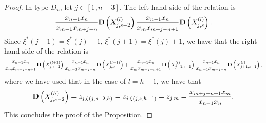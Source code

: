 \documentclass[10pt,a4paper]{amsart}
\newcommand\scalemath[2]{\scalebox{#1}{\mbox{\ensuremath{\displaystyle #2}}}}
\begin{document}
\begin{proof}
In type $D_n$, let $j \in [1,n-3]$. The left hand side of the relation is
\begin{align*}
\frac{x_{n-1}x_n}{x_{m-1}x_{m+j-n}} {\bf D}\left( X_{j,s-2}^{(l)} \right) \frac{x_{n-1}x_n}{x_{m}x_{m+j-n+1}} {\bf D}\left( X_{j,s}^{(l)} \right). 
\end{align*}
Since $\xi^*(j-1) = \xi^*(j)-1$, $\xi^*(j+1) = \xi^*(j)+1$, we have that the right hand side of the relation is 
\begin{align*}
\scalemath{0.86}{
\frac{x_{n-1}x_n}{x_{m}x_{m+j-n+1}} {\bf D}\left( X_{j,s-2}^{(l+1)} \right) \frac{x_{n-1}x_n}{x_{m-1}x_{m+j-n}} {\bf D}\left( X_{j,s}^{(l-1)} \right) + \frac{x_{n-1}x_n}{x_{m}x_{m+j-n+1}}  {\bf D}\left( X_{j-1,s-1}^{(l)} \right) \frac{x_{n-1}x_n}{x_{m-1}x_{m+j-n}} {\bf D}\left( X_{j+1,s-1}^{(l)} \right),}
\end{align*}
where we have used that in the case of $l=h-1$, we have that 
\begin{align*}
{\bf D}\left( X_{j,s-2}^{(h)} \right) = z_{j,\zeta(j,s-2,h)} = z_{j,\zeta(j,s,h-1)} = z_{j,m} = \frac{x_{m+j-n+1}x_m}{x_{n-1}x_n}.
\end{align*}
This concludes the proof of the Proposition.
\end{proof}
\end{document}

